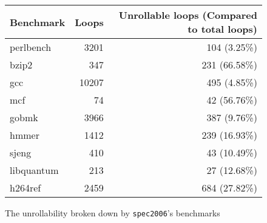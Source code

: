 \begin{figure}[H]
    \begin{center}
        \begin{tabular}{lrr}
            \toprule
            Benchmark & Loops & Unrollable loops (Compared to total loops)\\
            \midrule
            perlbench & 3201 & 104 (3.25\%)\\
            bzip2 & 347 & 231 (66.58\%)\\
            gcc & 10207  & 495 (4.85\%)\\
            mcf & 74 & 42 (56.76\%)\\
            gobmk & 3966 & 387 (9.76\%)\\
            hmmer & 1412 & 239 (16.93\%)\\
            sjeng & 410 & 43 (10.49\%) \\
            libquantum & 213 & 27 (12.68\%)\\
            h264ref & 2459 & 684 (27.82\%)\\
            \bottomrule
        \end{tabular}
    \end{center}
    \caption{The unrollability broken down by \texttt{spec2006}'s benchmarks}
    \label{fig:eval:unrollability:cmp-unrollability-bench}
\end{figure}
